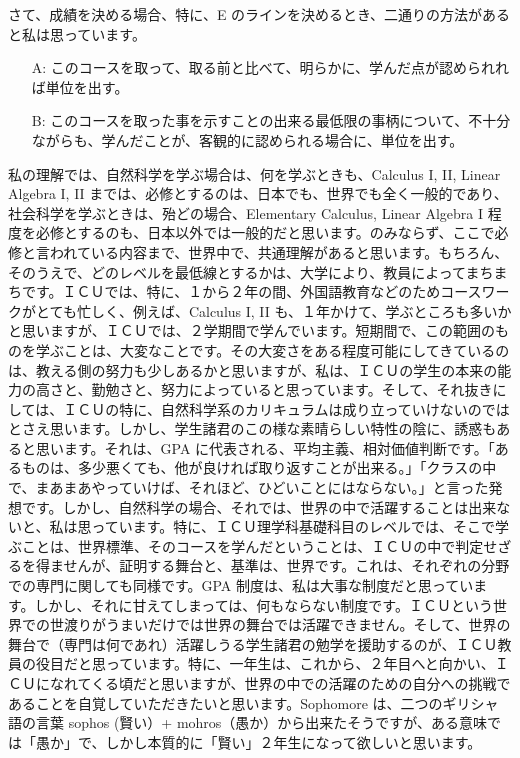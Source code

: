 {さて、成績を決める場合、特に、E のラインを決めるとき、二通りの方法があると私は思っています。
\begin{itemize}
\item[A: ] このコースを取って、取る前と比べて、明らかに、学んだ点が認められれば単位を出す。
\item[B: ] このコースを取った事を示すことの出来る最低限の事柄について、不十分ながらも、学んだことが、客観的に認められる場合に、単位を出す。
\end{itemize}
私の理解では、自然科学を学ぶ場合は、何を学ぶときも、Calculus I, II, Linear Algebra I, II までは、必修とするのは、日本でも、世界でも全く一般的であり、社会科学を学ぶときは、殆どの場合、Elementary Calculus, Linear Algebra I 程度を必修とするのも、日本以外では一般的だと思います。のみならず、ここで必修と言われている内容まで、世界中で、共通理解があると思います。もちろん、そのうえで、どのレベルを最低線とするかは、大学により、教員によってまちまちです。ＩＣＵでは、特に、１から２年の間、外国語教育などのためコースワークがとても忙しく、例えば、Calculus I, II も、１年かけて、学ぶところも多いかと思いますが、ＩＣＵでは、２学期間で学んでいます。短期間で、この範囲のものを学ぶことは、大変なことです。その大変さをある程度可能にしてきているのは、教える側の努力も少しあるかと思いますが、私は、ＩＣＵの学生の本来の能力の高さと、勤勉さと、努力によっていると思っています。そして、それ抜きにしては、ＩＣＵの特に、自然科学系のカリキュラムは成り立っていけないのではとさえ思います。しかし、学生諸君のこの様な素晴らしい特性の陰に、誘惑もあると思います。それは、GPA に代表される、平均主義、相対価値判断です。「あるものは、多少悪くても、他が良ければ取り返すことが出来る。」「クラスの中で、まあまあやっていけば、それほど、ひどいことにはならない。」と言った発想です。しかし、自然科学の場合、それでは、世界の中で活躍することは出来ないと、私は思っています。特に、ＩＣＵ理学科基礎科目のレベルでは、そこで学ぶことは、世界標準、そのコースを学んだということは、ＩＣＵの中で判定せざるを得ませんが、証明する舞台と、基準は、世界です。これは、それぞれの分野での専門に関しても同様です。GPA 制度は、私は大事な制度だと思っています。しかし、それに甘えてしまっては、何もならない制度です。ＩＣＵという世界での世渡りがうまいだけでは世界の舞台では活躍できません。そして、世界の舞台で（専門は何であれ）活躍しうる学生諸君の勉学を援助するのが、ＩＣＵ教員の役目だと思っています。特に、一年生は、これから、２年目へと向かい、ＩＣＵになれてくる頃だと思いますが、世界の中での活躍のための自分への挑戦であることを自覚していただきたいと思います。Sophomore は、二つのギリシャ語の言葉  sophos (賢い）+ mohros（愚か）から出来たそうですが、ある意味では「愚か」で、しかし本質的に「賢い」２年生になって欲しいと思います。

}
